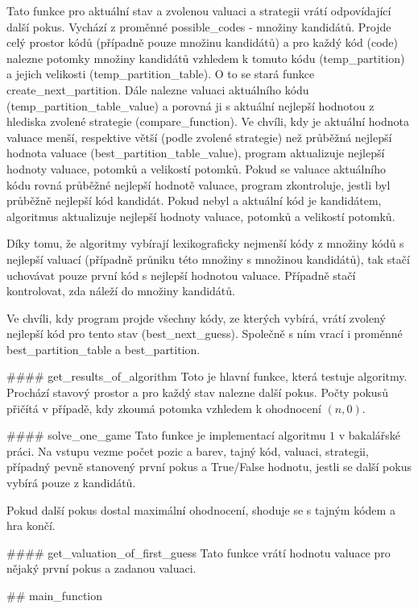 \documentclass[12pt,a4paper]{article}
\begin{document}
Tato funkce pro aktuální stav a zvolenou valuaci a strategii vrátí odpovídající další pokus. Vychází z proměnné possible_codes - množiny kandidátů. Projde celý prostor kódů (případně pouze množinu kandidátů) a pro každý kód (code) nalezne potomky množiny kandidátů vzhledem k tomuto kódu (temp_partition) a jejich velikosti (temp_partition_table). O to se stará funkce create_next_partition. Dále nalezne valuaci aktuálního kódu (temp_partition_table_value) a porovná ji s aktuální nejlepší hodnotou z hlediska zvolené strategie (compare_function). Ve chvíli, kdy je aktuální hodnota valuace menší, respektive větší (podle zvolené strategie) než průběžná nejlepší hodnota valuace (best_partition_table_value), program aktualizuje nejlepší hodnoty valuace, potomků a velikostí potomků. Pokud se valuace aktuálního kódu rovná průběžné nejlepší hodnotě valuace, program zkontroluje, jestli byl průběžně nejlepší kód kandidát. Pokud nebyl a aktuální kód je kandidátem, algoritmus aktualizuje nejlepší hodnoty valuace, potomků a velikostí potomků. 

Díky tomu, že algoritmy vybírají lexikograficky nejmenší kódy z množiny kódů s nejlepší valuací (případně průniku této množiny s množinou kandidátů), tak stačí uchovávat pouze první kód s nejlepší hodnotou valuace. Případně stačí kontrolovat, zda náleží do množiny kandidátů.

Ve chvíli, kdy program projde všechny kódy, ze kterých vybírá, vrátí zvolený nejlepší kód pro tento stav (best_next_guess). Společně s ním vrací i proměnné best_partition_table a best_partition. 

#### get_results_of_algorithm
Toto je hlavní funkce, která testuje algoritmy. Prochází stavový prostor a pro každý stav nalezne další pokus. Počty pokusů přičítá v případě, kdy zkoumá potomka vzhledem k ohodnocení $(n ,0)$.

#### solve_one_game
Tato funkce je implementací algoritmu $1$ v bakalářské práci. Na vstupu vezme počet pozic a barev, tajný kód, valuaci, strategii, případný pevně stanovený první pokus a True/False hodnotu, jestli se další pokus vybírá pouze z kandidátů. 

Pokud další pokus dostal maximální ohodnocení, shoduje se s tajným kódem a hra končí. 


#### get_valuation_of_first_guess
Tato funkce vrátí hodnotu valuace pro nějaký první pokus a zadanou valuaci. 

## main_function
\end{document}
